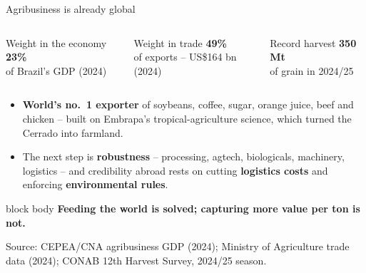 \documentclass[10pt,aspectratio=169]{beamer}
\newcommand{\source}[1]{%
  \par\vfill{\tiny\color{MidGray}Source: #1}}
\newcommand{\key}[1]{\textcolor{BrazilGreen}{\textbf{#1}}}
\newcommand{\warn}[1]{\textcolor{Brick}{\textbf{#1}}}
\newcommand{\question}[1]{%
  \begin{beamercolorbox}[rounded=true,sep=0.55em,wd=\textwidth]{block body}
    \centering\large\textbf{#1}
  \end{beamercolorbox}}
\begin{document}
\begin{frame}{Agribusiness is already global}
  \begin{columns}[T,onlytextwidth]
      \begin{block}{Weight in the economy}
        \centering
        {\fontsize{28}{32}\selectfont\color{DeepNavy}\textbf{23\%}}\\
        of Brazil's GDP (2024)
      \end{block}
      \begin{block}{Weight in trade}
        \centering
        {\fontsize{28}{32}\selectfont\color{DeepNavy}\textbf{49\%}}\\
        of exports -- US\$164 bn (2024)
      \end{block}
      \begin{block}{Record harvest}
        \centering
        {\fontsize{28}{32}\selectfont\color{DeepNavy}\textbf{350 Mt}}\\
        of grain in 2024/25
      \end{block}
  \end{columns}
  \smallskip
  \begin{itemize}
    \item \key{World's no.\ 1 exporter} of soybeans, coffee, sugar, orange juice, beef and chicken -- built on Embrapa's tropical-agriculture science, which turned the Cerrado into farmland.
    \item The next step is \key{robustness} -- processing, agtech, biologicals, machinery, logistics -- and credibility abroad rests on cutting \warn{logistics costs} and enforcing \warn{environmental rules}.
  \end{itemize}
  \question{Feeding the world is solved; capturing more value per ton is not.}
  \source{CEPEA/CNA agribusiness GDP (2024); Ministry of Agriculture trade data (2024); CONAB 12th Harvest Survey, 2024/25 season.}
\end{frame}
\end{document}
